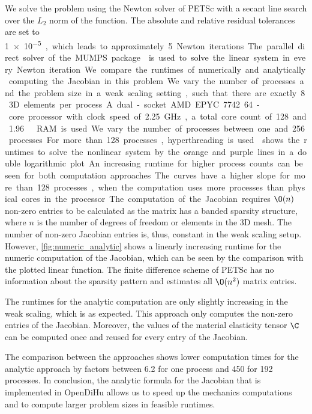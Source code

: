 We solve the problem using the Newton solver of PETSc with a secant line search over the $L_2$ norm of the function. The absolute and relative residual tolerances are set to \SI{1e-5}, which leads to approximately 5 Newton iterations. The parallel direct solver of the MUMPS package \cite{Mumps2017} is used to solve the linear system in every Newton iteration.

We compare the runtimes of numerically and analytically computing the Jacobian in this problem. We vary the number of processes and the problem size in a weak scaling setting, such that there are exactly 8 3D elements per process. A dual-socket AMD EPYC 7742 64-core processor with clock speed of \SI{2.25}{\giga\hertz}, a total core count of 128 and \SI{1.96}{\tera\byte} RAM is used. We vary the number of processes between one and 256 processes. For more than 128 processes, hyperthreading is used.

 shows the runtimes to solve the nonlinear system by the orange and purple lines in a double logarithmic plot. An increasing runtime for higher process counts can be seen for both computation approaches. The curves have a higher slope for more than 128 processes, when the computation uses more processes than physical cores in the processor.

The computation of the Jacobian requires $\O(n)$ non-zero entries to be calculated as the matrix has a banded sparsity structure, where $n$ is the number of degrees of freedom or elements in the 3D mesh. The number of non-zero Jacobian entries is, thus, constant in the weak scaling setup.
However, \cref{fig:numeric_analytic} shows a linearly increasing runtime for the numeric computation of the Jacobian, which can be seen by the comparison with the plotted linear function. 
The finite difference scheme of PETSc has no information about the sparsity pattern and estimates all $\O(n^2)$ matrix entries.

The runtimes for the analytic computation are only slightly increasing in the weak scaling, which is as expected. This approach only computes the non-zero entries of the Jacobian. Moreover, the values of the material elasticity tensor $\C$ can be computed once and reused for every entry of the Jacobian.

The comparison between the approaches shows lower computation times for the analytic approach by factors between \num{6.2} for one process and \num{450} for 192 processes. 
In conclusion, the analytic formula for the Jacobian that is implemented in OpenDiHu allows us to speed up the mechanics computations and to compute larger problem sizes in feasible runtimes.

